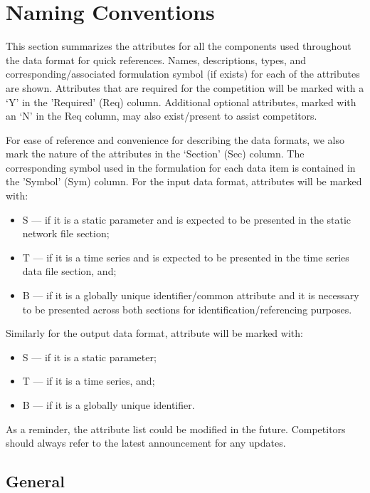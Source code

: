 \documentclass{article}
\begin{document}
\section{Naming Conventions}
\label{sec:naming}
This section summarizes the attributes for all the components used throughout the data format for quick references.
Names, descriptions, types, and corresponding/associated formulation symbol (if exists) for each of the attributes are shown.
Attributes that are required for the competition
will be marked with a `Y' in the 'Required' (Req) column.
Additional optional attributes, marked with an `N' in the Req column, may also exist/present to assist competitors.

For ease of reference and convenience for describing the data formats, we also
mark the nature of the attributes in the `Section' (Sec) column. The corresponding symbol used in the formulation for each data item is contained in the 'Symbol' (Sym) column.
For the input data format, attributes will be marked with:
\begin{itemize}
\item S --- if it is a static parameter and is expected to be presented in the static network file section;
\item T --- if it is a time series and is expected to be presented in the time series data file section, and;
\item B --- if it is a {\color{red} globally unique identifier/common attribute} and it is necessary to be presented across both sections for identification/referencing purposes.
\end{itemize}
Similarly for the output data format, attribute will be marked with:
\begin{itemize}
\item S --- if it is a static parameter;
\item T --- if it is a time series, and;
\item B --- if it is a {\color{red} globally unique identifier}.
\end{itemize}
As a reminder, the attribute list could be modified in the future.
Competitors should always refer to the latest announcement for any
updates.





\subsection{General}
\label{nom:top-level}
\end{document}
